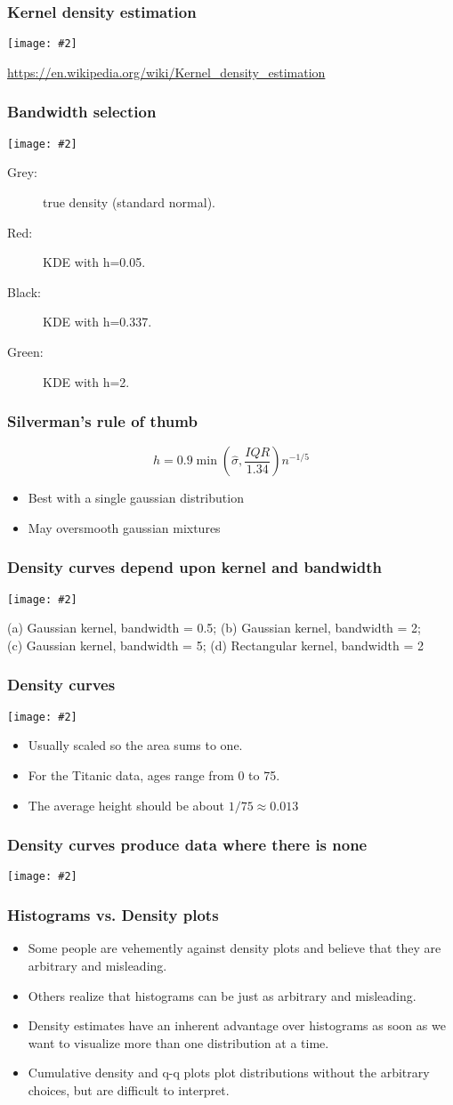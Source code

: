 \documentclass{beamer}
\newcommand{\bi}{\begin{itemize}}
\newcommand{\li}{\item}
\newcommand{\ei}{\end{itemize}}
\newcommand{\fig}[2]{\centerline{\texttt{[image: \#2]}}}
\newcommand{\bfr}[1]{\begin{frame}[fragile]\frametitle{{ #1 }}}
\begin{document}
\bfr{Kernel density estimation}
\fig{1}{Comparison_of_1D_histogram_and_KDE.png}
\vfill
\tiny
\url{https://en.wikipedia.org/wiki/Kernel_density_estimation}
\end{frame}

\bfr{Bandwidth selection}

\fig{0.5}{Comparison_of_1D_bandwidth_selectors.png}

\begin{description}
\li[Grey:] true density (standard normal). 
\li[Red:] KDE with h=0.05.
\li[Black:] KDE with h=0.337.
\li[Green:] KDE with h=2.
\end{description}
\end{frame}

\bfr{Silverman's rule of thumb}
\[
h = 0.9 \min\left(\hat{\sigma}, \frac{IQR}{1.34}\right) n^{-1/5}
\]
\bi
\li Best with a single gaussian distribution
\li May oversmooth gaussian mixtures
\ei
\end{frame}

\bfr{Density curves depend upon kernel and bandwidth}
\fig{1}{titanic-ages-dens-grid-1.png}
\scriptsize

(a) Gaussian kernel, bandwidth = 0.5; (b) Gaussian kernel, bandwidth = 2;\\ (c) Gaussian kernel, bandwidth = 5; (d) Rectangular kernel, bandwidth = 2
\end{frame}

\bfr{Density curves}

\fig{.8}{titanic-ages-dens1-1.png}
\bi
\li Usually scaled so the area sums to one.
\li For the Titanic data, ages range from 0 to 75.
\li The average height should be about $1/75 \approx 0.013$
\ei

\end{frame}

\bfr{Density curves produce data where there is none}

\fig{1}{titanic-ages-dens-negative-1.png}

\end{frame}

\bfr{Histograms vs. Density plots}

\bi
\li Some people are vehemently against density plots and believe that they are arbitrary and misleading.
\li Others realize that histograms can be just as arbitrary and misleading.
\li Density estimates have an inherent advantage over histograms as soon as we want to visualize more than one distribution at a time.
\li Cumulative density and q-q plots plot distributions without the
arbitrary choices, but are difficult to interpret.
\ei
\end{frame}
\end{document}
